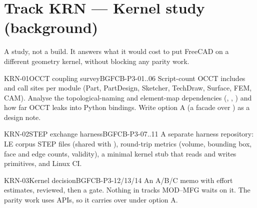 \section{Track KRN --- Kernel study (background)}\label{sec:krn}

A study, not a build. It answers what it would cost to put FreeCAD on a different geometry kernel, without
blocking any parity work.

\begin{epic}{KRN-01}{OCCT coupling survey}{BG}{\stTodo}{FCB-P3-01..06}
Script-count OCCT includes and call sites per module (Part, PartDesign, Sketcher, TechDraw, Surface, FEM,
CAM). Analyse the topological-naming and element-map dependencies (,
, ) and how far OCCT leaks into Python bindings. Write option A (a
facade over ) as a design note.
\end{epic}

\begin{epic}{KRN-02}{STEP exchange harness}{BG}{\stTodo}{FCB-P3-07..11}
A separate harness repository: LE corpus STEP files (shared with ), round-trip metrics
(volume, bounding box, face and edge counts, validity), a minimal kernel stub that reads and writes primitives,
and Linux CI.
\end{epic}

\begin{epic}{KRN-03}{Kernel decision}{BG}{\stTodo}{FCB-P3-12/13/14}
An A/B/C memo with effort estimates, reviewed, then a gate. Nothing in tracks MOD--MFG waits on it. The
parity work uses  APIs, so it carries over under option A.
\end{epic}
